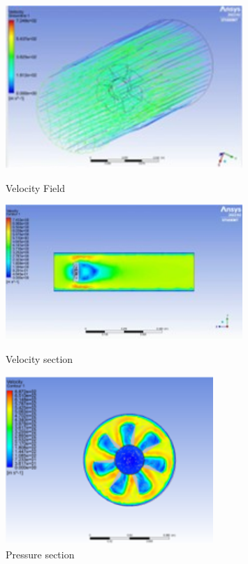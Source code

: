 \documentclass[10pt, letterpaper]{article}
\begin{document}
\begin{figure}[!b]
        \begin{minipage}[t]{0.33\linewidth}
            \centering
            \includegraphics[width=0.8\textwidth]{fig/SGS Intern/Velictiy field.jpg} 
            \caption{Velocity Field}
        \end{minipage}%
        \begin{minipage}[t]{0.33\linewidth}
            \centering
            \includegraphics[width=0.8\textwidth]{fig/SGS Intern/Velocity field2.jpg}
            \caption{Velocity section}
        \end{minipage}%
        \begin{minipage}[t]{0.33\linewidth}
            \centering
            \includegraphics[width=0.7\textwidth]{fig/SGS Intern/Pressure.png}
            \caption{Pressure section}
        \end{minipage}


\end{figure}
\end{document}
